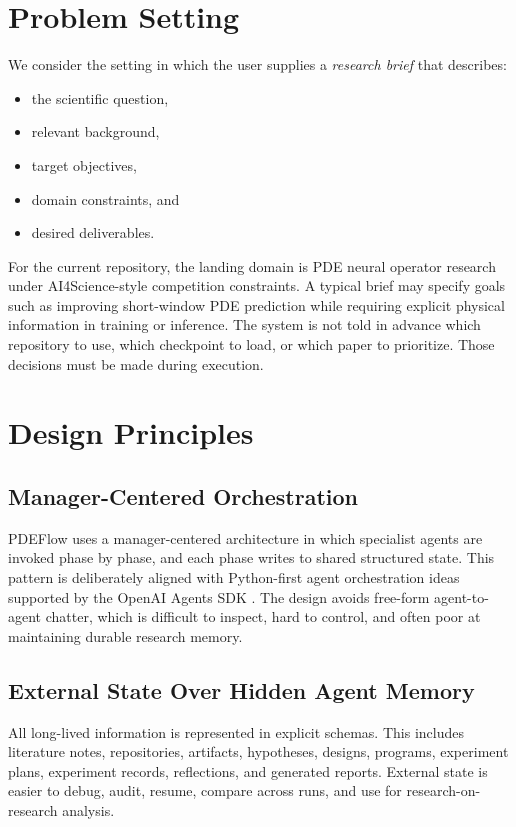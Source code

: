 \documentclass[11pt]{article}
\begin{document}
\section{Problem Setting}
We consider the setting in which the user supplies a \emph{research brief} that describes:
\begin{itemize}[leftmargin=1.5em]
  \item the scientific question,
  \item relevant background,
  \item target objectives,
  \item domain constraints, and
  \item desired deliverables.
\end{itemize}

For the current repository, the landing domain is PDE neural operator research under AI4Science-style competition constraints. A typical brief may specify goals such as improving short-window PDE prediction while requiring explicit physical information in training or inference. The system is not told in advance which repository to use, which checkpoint to load, or which paper to prioritize. Those decisions must be made during execution.

\section{Design Principles}
\subsection{Manager-Centered Orchestration}
PDEFlow uses a manager-centered architecture in which specialist agents are invoked phase by phase, and each phase writes to shared structured state. This pattern is deliberately aligned with Python-first agent orchestration ideas supported by the OpenAI Agents SDK \cite{openai_agents_sdk}. The design avoids free-form agent-to-agent chatter, which is difficult to inspect, hard to control, and often poor at maintaining durable research memory.

\subsection{External State Over Hidden Agent Memory}
All long-lived information is represented in explicit schemas. This includes literature notes, repositories, artifacts, hypotheses, designs, programs, experiment plans, experiment records, reflections, and generated reports. External state is easier to debug, audit, resume, compare across runs, and use for research-on-research analysis.
\end{document}
